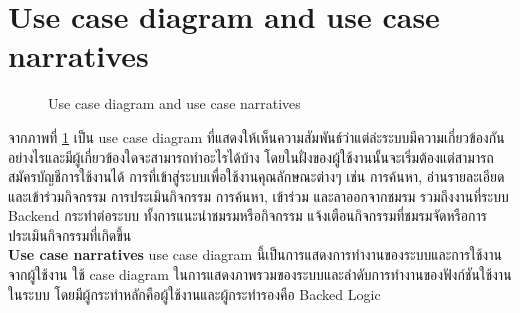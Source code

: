 \documentclass[14pt,oneside,openright,a4paper]{cpe-thai-project}
\begin{document}
\section{Use case diagram and use case narratives}

  \begin{figure}[!h]\centering
    \setlength{\fboxrule}{0.5mm} %
    \setlength{\fboxsep}{0.5cm}
    \caption{Use case diagram and use case narratives}\label{fig:usecasediagram}
  \end{figure}

  จากภาพที่ \ref{fig:usecasediagram} เป็น use case diagram ที่แสดงให้เห็นความสัมพันธ์ว่าแต่ล่ะระบบมีความเกี่ยวข้องกันอย่างไรและมีผู้เกี่ยวข้องใดจะสามารถทำอะไรได้บ้าง โดยในฝั่งของผู้ใช้งานนั้นจะเริ่มต้องแต่สามารถสมัครบัญชีการใช้งานได้ การที่เข้าสู่ระบบเพื่อใช้งานคุณลักษณะต่างๆ เช่น การค้นหา, อ่านรายละเอียดและเข้าร่วมกิจกรรม การประเมินกิจกรรม การค้นหา, เข้าร่วม และลาออกจากชมรม รวมถึงงานที่ระบบ Backend กระทำต่อระบบ ทั้งการแนะนำชมรมหรือกิจกรรม แจ้งเตือนกิจกรรมที่ชมรมจัดหรือการประเมินกิจกรรมที่เกิดขึ้น\\

\textbf{Use case narratives} 
use case diagram นี้เป็นการแสดงการทำงานของระบบและการใช้งานจากผู้ใช้งาน ใช้ case diagram ในการแสดงภาพรวมของระบบและลำดับการทำงานของฟังก์ชันใช้งานในระบบ โดยมีผู้กระทำหลักคือผู้ใช้งานและผู้กระทำรองคือ Backed Logic\\
\end{document}
